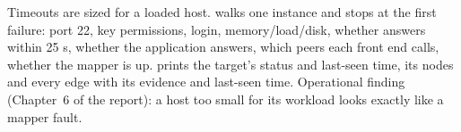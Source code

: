 \begin{techbox}
Timeouts are sized for a loaded host.  walks one instance and stops at the first failure: port 22, key permissions, login, memory/load/disk, whether  answers within 25 s, whether the application answers, which peers each front end calls, whether the mapper is up.  prints the target's status and last-seen time, its nodes and every edge with its evidence and last-seen time. Operational finding (Chapter~6 of the report): a host too small for its workload looks exactly like a mapper fault.
\end{techbox}

